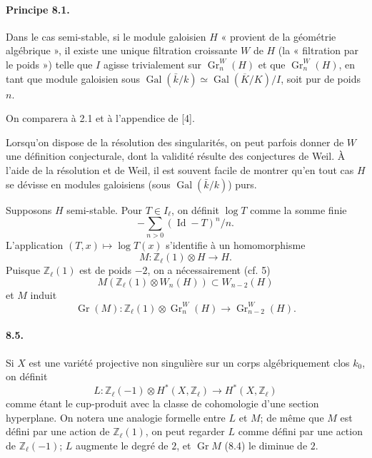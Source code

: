 \documentclass[10pt]{article}
\newcommand{\Zl}{\mathbb Z_\ell}
\newcommand{\Gr}{\operatorname{Gr}}
\newcommand{\Gal}{\operatorname{Gal}}
\newcommand{\Id}{\operatorname{Id}}
\newcommand{\barK}{\overline{K}}
\begin{document}
\paragraph{Principe 8.1.} Dans le cas semi-stable, si le module galoisien $H$ « provient de la géométrie algébrique », il existe une unique filtration croissante $W$ de $H$ (la « filtration par le poids ») telle que $I$ agisse trivialement sur $\Gr_n^W(H)$ et que $\Gr_n^W(H)$, en tant que module galoisien sous $\Gal(\bar k/k)\simeq\Gal(\barK/K)/I$, soit pur de poids $n$.

On comparera à 2.1 et à l'appendice de [4].

Lorsqu'on dispose de la résolution des singularités, on peut parfois donner de $W$ une définition conjecturale, dont la validité résulte des conjectures de Weil. À l'aide de la résolution et de Weil, il est souvent facile de montrer qu'en tout cas $H$ se dévisse en modules galoisiens (sous $\Gal(\bar k/k)$) purs.

Supposons $H$ semi-stable. Pour $T\in I_\ell$, on définit $\log T$ comme la somme finie
\[
-\sum_{n>0}(\Id-T)^n/n.
\]
L'application $(T,x)\mapsto\log T(x)$ s'identifie à un homomorphisme
\[
\tag{8.2}
M:\Zl(1)\otimes H\longrightarrow H.
\]
Puisque $\Zl(1)$ est de poids $-2$, on a nécessairement (cf. 5)
\[
\tag{8.3}
M(\Zl(1)\otimes W_n(H))\subset W_{n-2}(H)
\]
et $M$ induit
\[
\tag{8.4}
\Gr(M):\Zl(1)\otimes\Gr_n^W(H)\longrightarrow\Gr_{n-2}^W(H).
\]

\paragraph{8.5.} Si $X$ est une variété projective non singulière sur un corps algébriquement clos $k_0$, on définit
\[
L:\Zl(-1)\otimes H^*(X,\Zl)\longrightarrow H^*(X,\Zl)
\]
comme étant le cup-produit avec la classe de cohomologie d'une section hyperplane. On notera une analogie formelle entre $L$ et $M$; de même que $M$ est défini par une action de $\Zl(1)$, on peut regarder $L$ comme défini par une action de $\Zl(-1)$; $L$ augmente le degré de $2$, et $\Gr M$ (8.4) le diminue de $2$.
\end{document}
